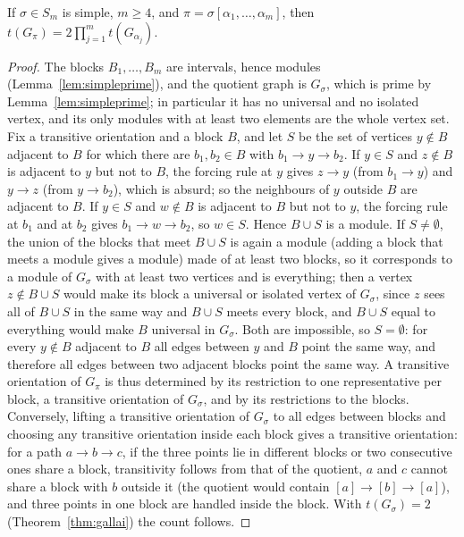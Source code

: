 \begin{lemma}\label{lem:inflation}
If $\sigma\in S_m$ is simple, $m\ge4$, and $\pi=\sigma[\alpha_1,\dots,\alpha_m]$, then $t(G_\pi)=2\prod_{j=1}^m t(G_{\alpha_j})$. 
\end{lemma}
\begin{proof}
The blocks $B_1,\dots,B_m$ are intervals, hence modules (Lemma~\ref{lem:simpleprime}), and the quotient graph is $G_\sigma$, which is prime by Lemma~\ref{lem:simpleprime}; in particular it has no universal and no isolated vertex, and its only modules with at least two elements are the whole vertex set. Fix a transitive orientation and a block $B$, and let $S$ be the set of vertices $y\notin B$ adjacent to $B$ for which there are $b_1,b_2\in B$ with $b_1\to y\to b_2$. If $y\in S$ and $z\notin B$ is adjacent to $y$ but not to $B$, the forcing rule at $y$ gives $z\to y$ (from $b_1\to y$) and $y\to z$ (from $y\to b_2$), which is absurd; so the neighbours of $y$ outside $B$ are adjacent to $B$. If $y\in S$ and $w\notin B$ is adjacent to $B$ but not to $y$, the forcing rule at $b_1$ and at $b_2$ gives $b_1\to w\to b_2$, so $w\in S$. Hence $B\cup S$ is a module. If $S\ne\emptyset$, the union of the blocks that meet $B\cup S$ is again a module (adding a block that meets a module gives a module) made of at least two blocks, so it corresponds to a module of $G_\sigma$ with at least two vertices and is everything; then a vertex $z\notin B\cup S$ would make its block a universal or isolated vertex of $G_\sigma$, since $z$ sees all of $B\cup S$ in the same way and $B\cup S$ meets every block, and $B\cup S$ equal to everything would make $B$ universal in $G_\sigma$. Both are impossible, so $S=\emptyset$: for every $y\notin B$ adjacent to $B$ all edges between $y$ and $B$ point the same way, and therefore all edges between two adjacent blocks point the same way. A transitive orientation of $G_\pi$ is thus determined by its restriction to one representative per block, a transitive orientation of $G_\sigma$, and by its restrictions to the blocks. Conversely, lifting a transitive orientation of $G_\sigma$ to all edges between blocks and choosing any transitive orientation inside each block gives a transitive orientation: for a path $a\to b\to c$, if the three points lie in different blocks or two consecutive ones share a block, transitivity follows from that of the quotient, $a$ and $c$ cannot share a block with $b$ outside it (the quotient would contain $[a]\to[b]\to[a]$), and three points in one block are handled inside the block. With $t(G_\sigma)=2$ (Theorem~\ref{thm:gallai}) the count follows.
\end{proof}


